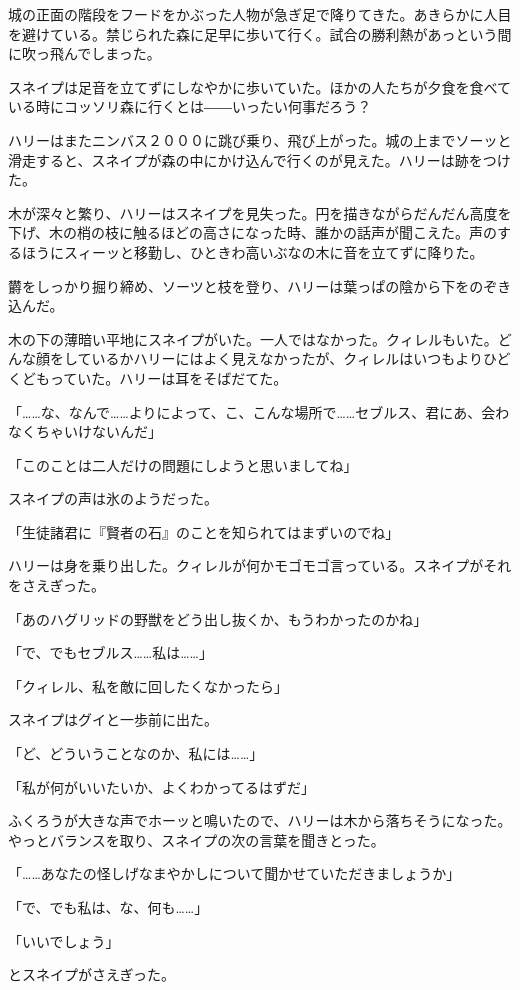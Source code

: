 \documentclass[10pt,a4paper]{article}
\begin{document}
\begin{CJK}{UTF8}{min}
城の正面の階段をフードをかぶった人物が急ぎ足で降りてきた。あきらかに人目を避けている。禁じられた森に足早に歩いて行く。試合の勝利熱があっという間に吹っ飛んでしまった。

スネイプは足音を立てずにしなやかに歩いていた。ほかの人たちが夕食を食べている時にコッソリ森に行くとは――いったい何事だろう？

ハリーはまたニンバス２０００に跳び乗り、飛び上がった。城の上までソーッと滑走すると、スネイプが森の中にかけ込んで行くのが見えた。ハリーは跡をつけた。

木が深々と繁り、ハリーはスネイプを見失った。円を描きながらだんだん高度を下げ、木の梢の枝に触るほどの高さになった時、誰かの話声が聞こえた。声のするほうにスィーッと移勤し、ひときわ高いぶなの木に音を立てずに降りた。

欝をしっかり掘り締め、ソーツと枝を登り、ハリーは葉っぱの陰から下をのぞき込んだ。

木の下の薄暗い平地にスネイプがいた。一人ではなかった。クィレルもいた。どんな顔をしているかハリーにはよく見えなかったが、クィレルはいつもよりひどくどもっていた。ハリーは耳をそばだてた。

「……な、なんで……よりによって、こ、こんな場所で……セブルス、君にあ、会わなくちゃいけないんだ」

「このことは二人だけの問題にしようと思いましてね」

スネイプの声は氷のようだった。

「生徒諸君に『賢者の石』のことを知られてはまずいのでね」

ハリーは身を乗り出した。クィレルが何かモゴモゴ言っている。スネイプがそれをさえぎった。

「あのハグリッドの野獣をどう出し抜くか、もうわかったのかね」

「で、でもセブルス……私は……」

「クィレル、私を敵に回したくなかったら」

スネイプはグイと一歩前に出た。

「ど、どういうことなのか、私には……」

「私が何がいいたいか、よくわかってるはずだ」

ふくろうが大きな声でホーッと鳴いたので、ハリーは木から落ちそうになった。やっとバランスを取り、スネイプの次の言葉を聞きとった。

「……あなたの怪しげなまやかしについて聞かせていただきましょうか」

「で、でも私は、な、何も……」

「いいでしょう」

とスネイプがさえぎった。


\end{CJK}
\end{document}
